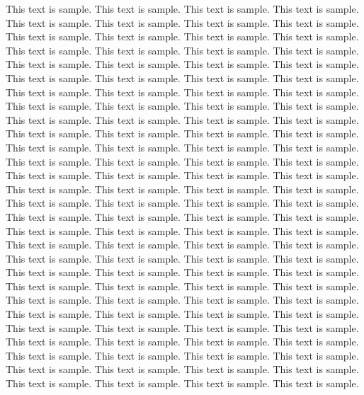 This text is sample. This text is sample. This text is sample. This text is sample. This text is sample. This text is sample. This text is sample. This text is sample. This text is sample. This text is sample. This text is sample. This text is sample. This text is sample. This text is sample. This text is sample. This text is sample. This text is sample. This text is sample. This text is sample. This text is sample. This text is sample. This text is sample. This text is sample. This text is sample. This text is sample. This text is sample. This text is sample. This text is sample. This text is sample. This text is sample. This text is sample. This text is sample. This text is sample. This text is sample. This text is sample. This text is sample. This text is sample. This text is sample. This text is sample. This text is sample. This text is sample. This text is sample. This text is sample. This text is sample. This text is sample. This text is sample. This text is sample. This text is sample. This text is sample. This text is sample. This text is sample. This text is sample. This text is sample. This text is sample. This text is sample. This text is sample. This text is sample. This text is sample. This text is sample. This text is sample. This text is sample. This text is sample. This text is sample. This text is sample. This text is sample. This text is sample. This text is sample. This text is sample. This text is sample. This text is sample. This text is sample. This text is sample. This text is sample. This text is sample. This text is sample. This text is sample. This text is sample. This text is sample. This text is sample. This text is sample. This text is sample. This text is sample. This text is sample. This text is sample. This text is sample. This text is sample. This text is sample. This text is sample. This text is sample. This text is sample. This text is sample. This text is sample. This text is sample. This text is sample. This text is sample. This text is sample. This text is sample. This text is sample. This text is sample. This text is sample. This text is sample. This text is sample. This text is sample. This text is sample. This text is sample. This text is sample. This text is sample. This text is sample. This text is sample. This text is sample. This text is sample. This text is sample. 

